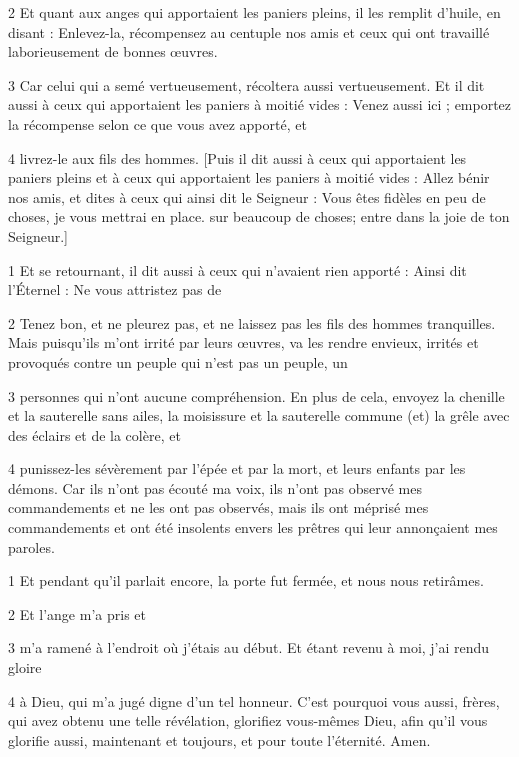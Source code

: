 \par 2 Et quant aux anges qui apportaient les paniers pleins, il les remplit d'huile, en disant : Enlevez-la, récompensez au centuple nos amis et ceux qui ont travaillé laborieusement de bonnes œuvres.

\par 3 Car celui qui a semé vertueusement, récoltera aussi vertueusement. Et il dit aussi à ceux qui apportaient les paniers à moitié vides : Venez aussi ici ; emportez la récompense selon ce que vous avez apporté, et

\par 4 livrez-le aux fils des hommes. [Puis il dit aussi à ceux qui apportaient les paniers pleins et à ceux qui apportaient les paniers à moitié vides : Allez bénir nos amis, et dites à ceux qui ainsi dit le Seigneur : Vous êtes fidèles en peu de choses, je vous mettrai en place. sur beaucoup de choses; entre dans la joie de ton Seigneur.]


\par 1 Et se retournant, il dit aussi à ceux qui n'avaient rien apporté : Ainsi dit l'Éternel : Ne vous attristez pas de

\par 2 Tenez bon, et ne pleurez pas, et ne laissez pas les fils des hommes tranquilles. Mais puisqu'ils m'ont irrité par leurs œuvres, va les rendre envieux, irrités et provoqués contre un peuple qui n'est pas un peuple, un

\par 3 personnes qui n'ont aucune compréhension. En plus de cela, envoyez la chenille et la sauterelle sans ailes, la moisissure et la sauterelle commune (et) la grêle avec des éclairs et de la colère, et

\par 4 punissez-les sévèrement par l'épée et par la mort, et leurs enfants par les démons. Car ils n'ont pas écouté ma voix, ils n'ont pas observé mes commandements et ne les ont pas observés, mais ils ont méprisé mes commandements et ont été insolents envers les prêtres qui leur annonçaient mes paroles.


\par 1 Et pendant qu'il parlait encore, la porte fut fermée, et nous nous retirâmes.

\par 2 Et l'ange m'a pris et

\par 3 m'a ramené à l'endroit où j'étais au début. Et étant revenu à moi, j'ai rendu gloire

\par 4 à Dieu, qui m'a jugé digne d'un tel honneur. C'est pourquoi vous aussi, frères, qui avez obtenu une telle révélation, glorifiez vous-mêmes Dieu, afin qu'il vous glorifie aussi, maintenant et toujours, et pour toute l'éternité. Amen.

